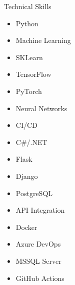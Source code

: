 \begin{rSection}{Technical Skills}
\begin{multicols}{2}
\begin{itemize}[leftmargin=*,nosep]
\item Python
\item Machine Learning
\item SKLearn
\item TensorFlow
\item PyTorch
\item Neural Networks
\item CI/CD
\item C\#/.NET
\item Flask
\item Django
\item PostgreSQL
\item API Integration
\item Docker
\item Azure DevOps
\item MSSQL Server
\item GitHub Actions
\end{itemize}
\end{multicols}
\end{rSection}